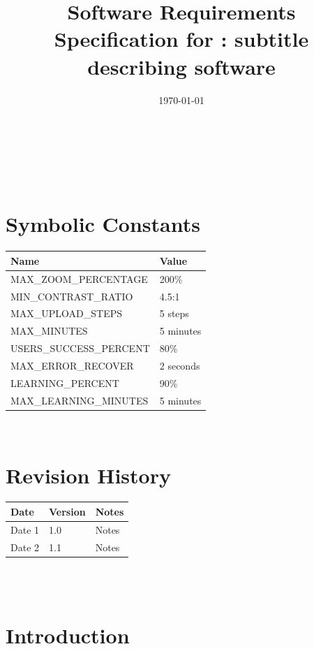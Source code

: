 \documentclass[12pt]{article}
\begin{document}
\title{Software Requirements Specification for \progname: subtitle
describing software}
\author{\authname}
\date{\today}

\maketitle

~\newpage


\tableofcontents
~\newpage

\section*{Symbolic Constants}
\begin{tabularx}{\textwidth}{|X|X|}
\toprule {\textbf{Name}} & {\textbf{Value}}\\
\midrule
MAX\_ZOOM\_PERCENTAGE & 200\%\\
MIN\_CONTRAST\_RATIO & 4.5:1\\
MAX\_UPLOAD\_STEPS & 5 steps\\
MAX\_MINUTES & 5 minutes\\
USERS\_SUCCESS\_PERCENT & 80\%\\
MAX\_ERROR\_RECOVER & 2 seconds \\
LEARNING\_PERCENT & 90\% \\
MAX\_LEARNING\_MINUTES & 5 minutes \\


\bottomrule
\end{tabularx}

~\newpage

\section*{Revision History}

\begin{tabularx}{\textwidth}{p{3cm}p{2cm}X}
  \toprule {\textbf{Date}} & {\textbf{Version}} & {\textbf{Notes}}\\
  \midrule
  Date 1 & 1.0 & Notes\\
  Date 2 & 1.1 & Notes\\
  \bottomrule
\end{tabularx}

~\\

~\newpage
\section{Introduction}
\end{document}
